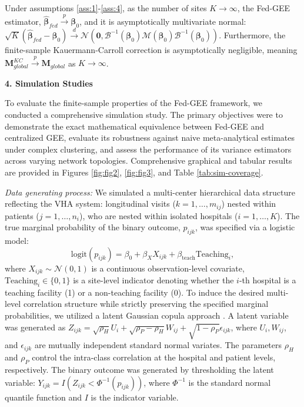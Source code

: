 \documentclass[useAMS,referee, usegraphicx]{biom}
\begin{document}
\begin{theorem}
\label{thm:asymptotics}
Under assumptions \autoref{ass:1}-\autoref{ass:4}, as the number of sites $K \to \infty$, the Fed-GEE estimator, $\hat{\boldsymbol{\beta}}_{fed} \xrightarrow{p} \boldsymbol{\beta}_0$, and it is asymptotically multivariate normal: $\sqrt{K}(\hat{\boldsymbol{\beta}}_{fed} - \boldsymbol{\beta}_0) \xrightarrow{d} \mathcal{N}\left(\mathbf{0}, \mathcal{B}^{-1}(\boldsymbol{\beta}_0) \mathcal{M}(\boldsymbol{\beta}_0) \mathcal{B}^{-1}(\boldsymbol{\beta}_0)\right)$. Furthermore, the finite-sample Kauermann-Carroll correction is asymptotically negligible, meaning $\mathbf{M}_{global}^{KC} \xrightarrow{p} \mathbf{M}_{global}$ as $K \to \infty$.
\end{theorem}
\textbf{4. Simulation Studies}

\noindent To evaluate the finite-sample properties of the Fed-GEE framework, we conducted a comprehensive simulation study. The primary objectives were to demonstrate the exact mathematical equivalence between Fed-GEE and centralized GEE, evaluate its robustness against naive meta-analytical estimates under complex clustering, and assess the performance of its variance estimators across varying network topologies. Comprehensive graphical and tabular results are provided in Figures \ref{fig:fig2}, \ref{fig:fig3}, and Table \ref{tab:sim-coverage}.

\emph{Data generating process:} We simulated a multi-center hierarchical data structure reflecting the VHA system: longitudinal visits ($k = 1, \dots, m_{ij}$) nested within patients ($j = 1, \dots, n_i$), who are nested within isolated hospitals ($i = 1, \dots, K$). The true marginal probability of the binary outcome, $p_{ijk}$, was specified via a logistic model: $$\text{logit}(p_{ijk}) = \beta_0 + \beta_X X_{ijk} + \beta_{\text{teach}} \text{Teaching}_i,$$  where $X_{ijk} \sim \mathcal{N}(0, 1)$ is a continuous observation-level covariate, $\text{Teaching}_i \in \{0, 1\}$ is a site-level indicator denoting whether the $i$-th hospital is a teaching facility (1) or a non-teaching facility (0). To induce the desired multi-level correlation structure while strictly preserving the specified marginal probabilities, we utilized a latent Gaussian copula approach \citep{peter2007correlated}. A latent variable was generated as $Z_{ijk} = \sqrt{\rho_H} U_i + \sqrt{\rho_P - \rho_H} W_{ij} + \sqrt{1 - \rho_P} \epsilon_{ijk}$, where $U_i, W_{ij}$, and $\epsilon_{ijk}$ are mutually independent standard normal variates. The parameters $\rho_H$ and $\rho_P$ control the intra-class correlation at the hospital and patient levels, respectively. The binary outcome was generated by thresholding the latent variable: $Y_{ijk} = I(Z_{ijk} < \Phi^{-1}(p_{ijk}))$, where $\Phi^{-1}$ is the standard normal quantile function and $I$ is the indicator variable.
\end{document}
